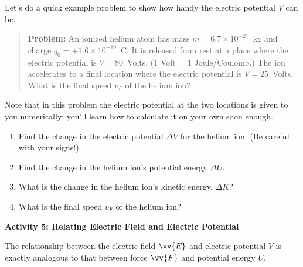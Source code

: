 Let's do a quick example problem to show how handy the electric potential $V$ can be.  
\begin{quote}
\textbf{Problem:} An ionized helium atom has mass $m=6.7\times 10^{-27}$~kg and charge $q_0=+1.6\times 10^{-19}$~C.  It is released from rest at a place where the electric potential is $V = 80$~Volts.  (1 Volt = 1 Joule/Coulomb.)  The ion accelerates to a final location where the electric potential is $V= 25$~Volts.  What is the final speed $v_F$ of the helium ion?  
\end{quote}
Note that in this problem the electric potential at the two locations is given to you numerically; you'll learn how to calculate it on your own soon enough.
\begin{enumerate}[wide, label=(\emph{\alph*})]
\item Find the change in the electric potential $\Delta V$ for the helium ion.  (Be careful with your signs!)
\answerspace{0.3in}

\item Find the change in the helium ion's potential energy $\Delta U$.  
\answerspace{0.3in}

\item What is the change in the helium ion's kinetic energy, $\Delta K$? 
\answerspace{0.3in}

\item What is the final speed $v_F$ of the helium ion?
\answerspace{0.6in}

\end{enumerate}

\textbf{Activity 5: Relating Electric Field and Electric Potential}

The relationship between the electric field $\vv{E}$ and electric potential $V$ is exactly analogous to that between force $\vv{F}$ and potential energy $U$.  

